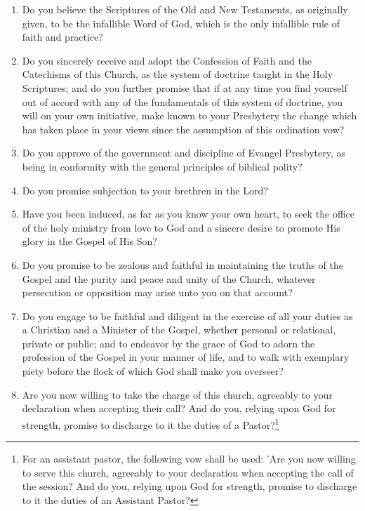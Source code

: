 \documentclass[
]{book}
\providecommand{\tightlist}{%
  \setlength{\itemsep}{0pt}\setlength{\parskip}{0pt}}
\begin{document}
\begin{enumerate}
  \begin{enumerate}
  \def\labelenumii{\alph{enumii}.}
  \tightlist
  \item
    Do you believe the Scriptures of the Old and New Testaments, as originally given, to be the infallible Word of God, which is the only infallible rule of faith and practice?
  \item
    Do you sincerely receive and adopt the Confession of Faith and the Catechisms of this Church, as the system of doctrine taught in the Holy Scriptures; and do you further promise that if at any time you find yourself out of accord with any of the fundamentals of this system of doctrine, you will on your own initiative, make known to your Presbytery the change which has taken place in your views since the assumption of this ordination vow?
  \item
    \protect\hypertarget{23.6.c}{\href{}{}}Do you approve of the government and discipline of Evangel Presbytery, as being in conformity with the general principles of biblical polity?
  \item
    Do you promise subjection to your brethren in the Lord?
  \item
    Have you been induced, as far as you know your own heart, to seek the office of the holy ministry from love to God and a sincere desire to promote His glory in the Gospel of His Son?
  \item
    Do you promise to be zealous and faithful in maintaining the truths of the Gospel and the purity and peace and unity of the Church, whatever persecution or opposition may arise unto you on that account?
  \item
    Do you engage to be faithful and diligent in the exercise of all your duties as a Christian and a Minister of the Gospel, whether personal or relational, private or public; and to endeavor by the grace of God to adorn the profession of the Gospel in your manner of life, and to walk with exemplary piety before the flock of which God shall make you overseer?
  \item
    Are you now willing to take the charge of this church, agreeably to your declaration when accepting their call? And do you, relying upon God for strength, promise to discharge to it the duties of a Pastor?\footnote{For an assistant pastor, the following vow shall be used: 'Are you now willing to serve this church, agreeably to your declaration when accepting the call of the session? And do you, relying upon God for strength, promise to discharge to it the duties of an Assistant Pastor?}
  \end{enumerate}
\end{enumerate}
\end{document}
